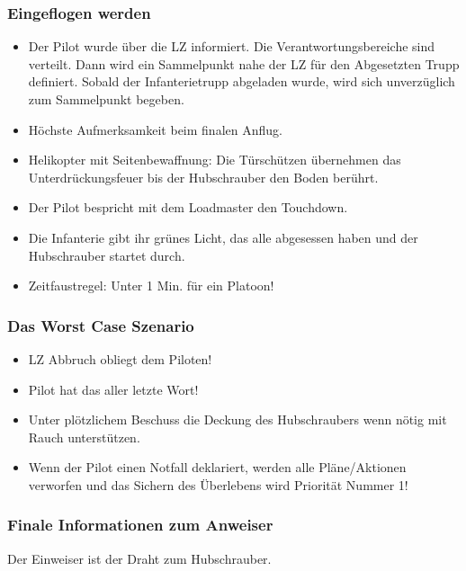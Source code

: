 \subsubsection{Eingeflogen werden}
	\begin{itemize} 
		\item Der Pilot wurde über die \ac{LZ} informiert. Die Verantwortungsbereiche sind verteilt. Dann wird ein Sammelpunkt nahe der \ac{LZ} für den Abgesetzten Trupp definiert. Sobald der Infanterietrupp abgeladen wurde, wird sich unverzüglich zum Sammelpunkt begeben.

		\item Höchste Aufmerksamkeit beim finalen Anflug.

		\item Helikopter mit Seitenbewaffnung: Die Türschützen übernehmen das Unterdrückungsfeuer bis der Hubschrauber den Boden berührt.

		\item Der Pilot bespricht mit dem Loadmaster den Touchdown.

		\item Die Infanterie gibt ihr grünes Licht, das alle abgesessen haben und der Hubschrauber startet durch.

		\item Zeitfaustregel: Unter 1 Min. für ein Platoon!
	\end{itemize}

\subsubsection{Das Worst Case Szenario}
	\begin{itemize}
		\item \ac{LZ} Abbruch obliegt dem Piloten!
		\item Pilot hat das aller letzte Wort!
		\item Unter plötzlichem Beschuss die Deckung des Hubschraubers wenn nötig mit Rauch unterstützen.
		\item Wenn der Pilot einen Notfall deklariert, werden alle Pläne/Aktionen verworfen und das Sichern des Überlebens wird Priorität Nummer 1!
	\end{itemize}

\subsubsection{Finale Informationen zum Anweiser}
	Der Einweiser ist der Draht zum Hubschrauber.

